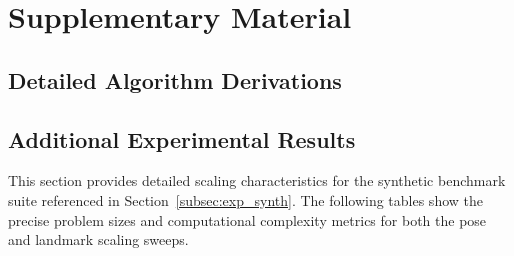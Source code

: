 \section{Supplementary Material}
\label{app:supplementary}


\subsection{Detailed Algorithm Derivations}
\label{app:derivations}


\subsection{Additional Experimental Results}
\label{app:additional_results}

This section provides detailed scaling characteristics for the synthetic benchmark suite referenced in Section~\ref{subsec:exp_synth}. The following tables show the precise problem sizes and computational complexity metrics for both the pose and landmark scaling sweeps.

